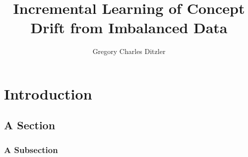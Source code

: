 \documentclass[12pt, twoside]{ruthesis}
\title{Incremental Learning of Concept Drift from Imbalanced Data}
\author{Gregory Charles Ditzler}
\begin{document}
{
\sloppy  \doublespacing
\begin{frontmatter}
  \maketitle
  
  
  {\singlespacing 
  \tableofcontents 
  \listoffigures
  \listoftables
  }
\end{frontmatter}


\chapter{Introduction}
\section{A Section}
\lipsum

\subsection{A Subsection}
\lipsum

{
\singlespacing
%
%
}

}
\end{document}
